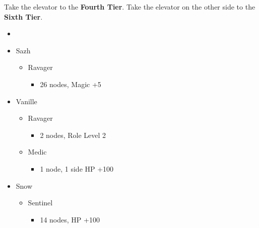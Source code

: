 	Take the elevator to the \textbf{Fourth Tier}.
	Take the elevator on the other side to the \textbf{Sixth Tier}.
	\begin{menu}
		\begin{itemize}
			\paradigm
			\begin{itemize}
				\item {}%
				      {\paradigmline[1]{\textit{\syn}}{\textit{\sab}}{\textit{\rav}}}%
				      {\paradigmline{\com}{\rav}{\rav}}%
				      {\paradigmline{\syn}{\med}{\com}}%
				      {\paradigmline{\com}{\med}{\com}}%
				      {\paradigmline{(\rav)}{\sab}{(\rav)}}%
				      {\paradigmline{\com}{\rav}{\com}}
			\end{itemize}
			\crystarium
			\begin{itemize}
				\item Sazh
				      \begin{itemize}
					      \item Ravager
					            \begin{itemize}
						            \item 26 nodes, Magic +5
					            \end{itemize}
				      \end{itemize}
				\item Vanille
				      \begin{itemize}
					      \item Ravager
					            \begin{itemize}
						            \item 2 nodes, Role Level 2
					            \end{itemize}
					      \item Medic
					            \begin{itemize}
						            \item 1 node, 1 side HP +100
					            \end{itemize}
				      \end{itemize}
				\item Snow
				      \begin{itemize}
					      \item Sentinel
					            \begin{itemize}
						            \item 14 nodes, HP +100
					            \end{itemize}
				      \end{itemize}

\end{itemize}
\end{itemize}
\end{menu}
